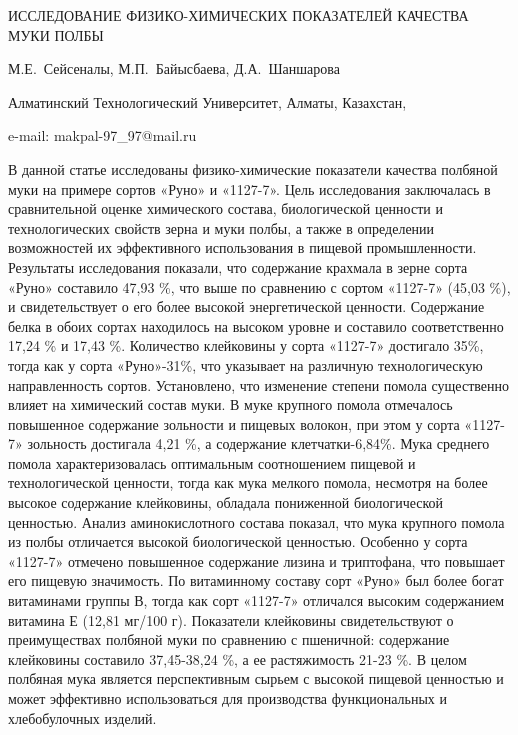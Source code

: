 \begin{header}
ИССЛЕДОВАНИЕ ФИЗИКО-ХИМИЧЕСКИХ ПОКАЗАТЕЛЕЙ КАЧЕСТВА МУКИ ПОЛБЫ

М.Е.~Сейсеналы\envelope,
М.П.~Байысбаева,
Д.А.~Шаншарова
\end{header}

\begin{affil}
Алматинский Технологический Университет, Алматы, Казахстан,

e-mail: makpal-97\_97@mail.ru
\end{affil}

В данной статье исследованы физико-химические показатели качества
полбяной муки на примере сортов «Руно» и «1127-7». Цель исследования
заключалась в сравнительной оценке химического состава, биологической
ценности и технологических свойств зерна и муки полбы, а также в
определении возможностей их эффективного использования в пищевой
промышленности. Результаты исследования показали, что содержание
крахмала в зерне сорта «Руно» составило 47,93 \%, что выше по сравнению
с сортом «1127-7» (45,03 \%), и свидетельствует о его более высокой
энергетической ценности. Содержание белка в обоих сортах находилось на
высоком уровне и составило соответственно 17,24 \% и 17,43 \%.
Количество клейковины у сорта «1127-7» достигало 35\%, тогда как у сорта
«Руно»-31\%, что указывает на различную технологическую направленность
сортов. Установлено, что изменение степени помола существенно влияет на
химический состав муки. В муке крупного помола отмечалось повышенное
содержание зольности и пищевых волокон, при этом у сорта «1127-7»
зольность достигала 4,21 \%, а содержание клетчатки-6,84\%. Мука
среднего помола характеризовалась оптимальным соотношением пищевой и
технологической ценности, тогда как мука мелкого помола, несмотря на
более высокое содержание клейковины, обладала пониженной биологической
ценностью. Анализ аминокислотного состава показал, что мука крупного
помола из полбы отличается высокой биологической ценностью. Особенно у
сорта «1127-7» отмечено повышенное содержание лизина и триптофана, что
повышает его пищевую значимость. По витаминному составу сорт «Руно» был
более богат витаминами группы В, тогда как сорт «1127-7» отличался
высоким содержанием витамина Е (12,81 мг/100 г). Показатели клейковины
свидетельствуют о преимуществах полбяной муки по сравнению с пшеничной:
содержание клейковины составило 37,45-38,24 \%, а ее растяжимость 21-23
\%. В целом полбяная мука является перспективным сырьем с высокой
пищевой ценностью и может эффективно использоваться для производства
функциональных и хлебобулочных изделий.

